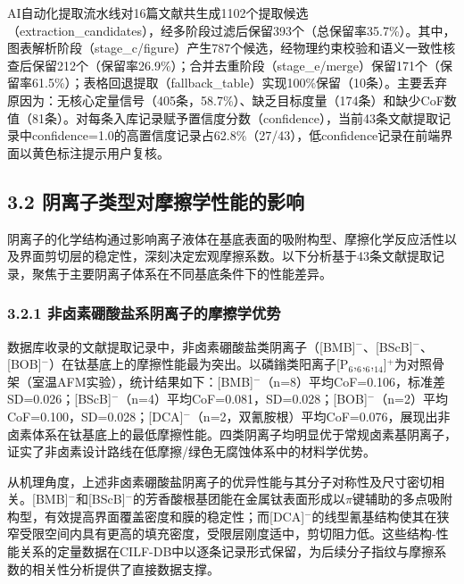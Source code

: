 AI自动化提取流水线对16篇文献共生成1102个提取候选（extraction\_candidates），经多阶段过滤后保留393个（总保留率35.7\%）。其中，图表解析阶段（stage\_c/figure）产生787个候选，经物理约束校验和语义一致性核查后保留212个（保留率26.9\%）；合并去重阶段（stage\_e/merge）保留171个（保留率61.5\%）；表格回退提取（fallback\_table）实现100\%保留（10条）。主要丢弃原因为：无核心定量信号（405条，58.7\%）、缺乏目标度量（174条）和缺少CoF数值（81条）。对每条入库记录赋予置信度分数（confidence），当前43条文献提取记录中confidence=1.0的高置信度记录占62.8\%（27/43），低confidence记录在前端界面以黄色标注提示用户复核。

\hypertarget{ux9634ux79bbux5b50ux7c7bux578bux5bf9ux6469ux64e6ux5b66ux6027ux80fdux7684ux5f71ux54cd}{%
\subsection{3.2 阴离子类型对摩擦学性能的影响}\label{ux9634ux79bbux5b50ux7c7bux578bux5bf9ux6469ux64e6ux5b66ux6027ux80fdux7684ux5f71ux54cd}}

阴离子的化学结构通过影响离子液体在基底表面的吸附构型、摩擦化学反应活性以及界面剪切层的稳定性，深刻决定宏观摩擦系数。以下分析基于43条文献提取记录，聚焦于主要阴离子体系在不同基底条件下的性能差异。

\hypertarget{ux975eux5364ux7d20ux787cux9178ux76d0ux7cfbux9634ux79bbux5b50ux7684ux6469ux64e6ux5b66ux4f18ux52bf}{%
\subsubsection{3.2.1 非卤素硼酸盐系阴离子的摩擦学优势}\label{ux975eux5364ux7d20ux787cux9178ux76d0ux7cfbux9634ux79bbux5b50ux7684ux6469ux64e6ux5b66ux4f18ux52bf}}

数据库收录的文献提取记录中，非卤素硼酸盐类阴离子（{[}BMB{]}$^{-}$、{[}BScB{]}$^{-}$、{[}BOB{]}$^{-}$）在钛基底上的摩擦性能最为突出。以磷鎓类阳离子{[}P$_{6}$,$_{6}$,$_{6}$,$_{14}${]}$^{+}$为对照骨架（室温AFM实验），统计结果如下：{[}BMB{]}$^{-}$（n=8）平均CoF=0.106，标准差 SD=0.026；{[}BScB{]}$^{-}$（n=4）平均CoF=0.081，SD=0.028；{[}BOB{]}$^{-}$（n=2）平均CoF=0.100，SD=0.028；{[}DCA{]}$^{-}$（n=2，双氰胺根）平均CoF=0.076，展现出非卤素体系在钛基底上的最低摩擦性能。四类阴离子均明显优于常规卤素基阴离子，证实了非卤素设计路线在低摩擦/绿色无腐蚀体系中的材料学优势。

从机理角度，上述非卤素硼酸盐阴离子的优异性能与其分子对称性及尺寸密切相关。{[}BMB{]}$^{-}$和{[}BScB{]}$^{-}$的芳香酸根基团能在金属钛表面形成以$\pi$键辅助的多点吸附构型，有效提高界面覆盖密度和膜的稳定性；而{[}DCA{]}$^{-}$的线型氰基结构使其在狭窄受限空间内具有更高的填充密度，受限层刚度适中，剪切阻力低。这些结构-性能关系的定量数据在CILF-DB中以逐条记录形式保留，为后续分子指纹与摩擦系数的相关性分析提供了直接数据支撑。

